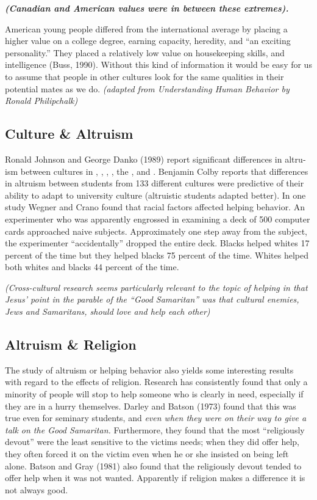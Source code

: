 \documentclass[
]{book}
\begin{document}
\textbf{\emph{(Canadian and American values were in between these extremes).}}

American young people differed from the international average by placing a higher value on a college degree, earning capacity, heredity, and ``an exciting personality.'' They placed a relatively low value on housekeeping skills, and intelligence (Buss, 1990). Without this kind of information it would be easy for us to assume that people in other cultures look for the same qualities in their potential mates as we do. \emph{(adapted from Understanding Human Behavior by Ronald Philipchalk)}

\hypertarget{culture-altruism}{%
\subsection*{Culture \& Altruism}\label{culture-altruism}}

Ronald Johnson and George Danko (1989) report significant differences in altru­ism between cultures in , , , , the , and . Benjamin Colby reports that differences in altruism between stu­dents from 133 different cultures were predictive of their ability to adapt to university culture (altruistic students adapted better). In one study Wegner and Crano found that racial fac­tors affected helping behavior. An exper­i­menter who was apparently engrossed in examining a deck of 500 computer cards approached naive subjects. Approximately one step away from the subject, the experimenter ``accidentally'' dropped the entire deck. Blacks helped whites 17 percent of the time but they helped blacks 75 percent of the time. Whites helped both whites and blacks 44 percent of the time.

\emph{(Cross-cultural research seems particularly rele­vant to the topic of helping in that Jesus' point in the parable of the ``Good Samaritan'' was that cultural enemies, Jews and Samaritans, should love and help each other)}

\hypertarget{altruism-religion}{%
\subsection*{Altruism \& Religion}\label{altruism-religion}}

The study of altruism or helping behavior also yields some interesting results with regard to the effects of religion. Research has consistently found that only a minority of people will stop to help someone who is clearly in need, especially if they are in a hurry themselves. Darley and Batson (1973) found that this was true even for seminary students, and \emph{even when they were on their way to give a talk on the Good Samaritan.} Furthermore, they found that the most ``religiously devout'' were the least sensitive to the victims needs; when they did offer help, they often forced it on the victim even when he or she insisted on being left alone. Batson and Gray (1981) also found that the religiously devout tended to offer help when it was not wanted. Apparently if religion makes a difference it is not always good.
\end{document}
